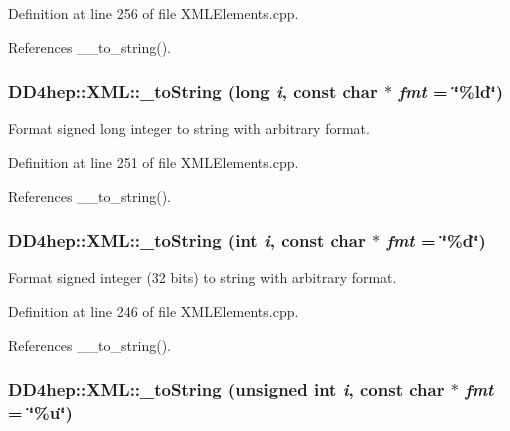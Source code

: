 Definition at line 256 of file XMLElements.cpp.

References \_\-\_\-to\_\-string().\hypertarget{group___d_d4_h_e_p___x_m_l_gab11cb9a1d8aa1ca280f2d88345983838}{
\subsubsection[{\_\-toString}]{ DD4hep::XML::\_\-toString (long {\em i}, \/  const char $\ast$ {\em fmt} = {\ttfamily \char`\"{}\%ld\char`\"{}})}}
\label{group___d_d4_h_e_p___x_m_l_gab11cb9a1d8aa1ca280f2d88345983838}


Format signed long integer to string with arbitrary format. 

Definition at line 251 of file XMLElements.cpp.

References \_\-\_\-to\_\-string().\hypertarget{group___d_d4_h_e_p___x_m_l_ga3db5e3893d601405e4881f4e59aab45a}{
\subsubsection[{\_\-toString}]{ DD4hep::XML::\_\-toString (int {\em i}, \/  const char $\ast$ {\em fmt} = {\ttfamily \char`\"{}\%d\char`\"{}})}}
\label{group___d_d4_h_e_p___x_m_l_ga3db5e3893d601405e4881f4e59aab45a}


Format signed integer (32 bits) to string with arbitrary format. 

Definition at line 246 of file XMLElements.cpp.

References \_\-\_\-to\_\-string().\hypertarget{group___d_d4_h_e_p___x_m_l_ga394251d8f037bcee0db303753aefc97b}{
\subsubsection[{\_\-toString}]{ DD4hep::XML::\_\-toString (unsigned int {\em i}, \/  const char $\ast$ {\em fmt} = {\ttfamily \char`\"{}\%u\char`\"{}})}}
\label{group___d_d4_h_e_p___x_m_l_ga394251d8f037bcee0db303753aefc97b}


